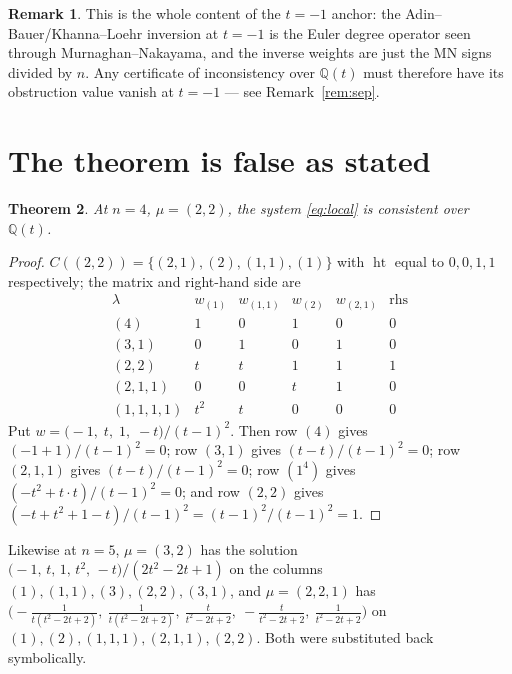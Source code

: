 \documentclass[11pt]{article}
\newtheorem{theorem}{Theorem}[section]
\theoremstyle{definition}
\newtheorem{remark}[theorem]{Remark}
\newcommand{\Q}{\mathbb{Q}}
\newcommand{\hgt}{\operatorname{ht}}      %
\begin{document}
\begin{remark}
This is the whole content of the $t=-1$ anchor: the Adin--Bauer/Khanna--Loehr inversion at
$t=-1$ is the Euler degree operator seen through Murnaghan--Nakayama, and the inverse weights
are just the MN signs divided by $n$. Any certificate of inconsistency over $\Q(t)$ must
therefore have its obstruction value vanish at $t=-1$ --- see Remark~\ref{rem:sep}.
\end{remark}

\section{The theorem is false as stated}\label{sec:false}

\begin{theorem}\label{thm:counterex}
At $n=4$, $\mu=(2,2)$, the system \eqref{eq:local} is consistent over $\Q(t)$.
\end{theorem}

\begin{proof}
$C((2,2))=\{(2,1),(2),(1,1),(1)\}$ with $\hgt$ equal to $0,0,1,1$ respectively; the matrix
and right-hand side are
\[
\begin{array}{l|cccc|c}
 \lambda & w_{(1)} & w_{(1,1)} & w_{(2)} & w_{(2,1)} & \text{rhs}\\\hline
 (4)       & 1 & 0 & 1 & 0 & 0\\
 (3,1)     & 0 & 1 & 0 & 1 & 0\\
 (2,2)     & t & t & 1 & 1 & 1\\
 (2,1,1)   & 0 & 0 & t & 1 & 0\\
 (1,1,1,1) & t^2& t& 0 & 0 & 0
\end{array}
\]
Put $w=\bigl(-1,\;t,\;1,\;-t\bigr)/(t-1)^2$. Then row $(4)$ gives $(-1+1)/(t-1)^2=0$; row
$(3,1)$ gives $(t-t)/(t-1)^2=0$; row $(2,1,1)$ gives $(t-t)/(t-1)^2=0$; row $(1^4)$ gives
$(-t^2+t\cdot t)/(t-1)^2=0$; and row $(2,2)$ gives
$(-t+t^2+1-t)/(t-1)^2=(t-1)^2/(t-1)^2=1$. \qedhere
\end{proof}

Likewise at $n=5$, $\mu=(3,2)$ has the solution
$\bigl(-1,\,t,\,1,\,t^2,\,-t\bigr)/(2t^2-2t+1)$ on the columns
$(1),(1,1),(3),(2,2),(3,1)$, and $\mu=(2,2,1)$ has
$\bigl(-\tfrac{1}{t(t^2-2t+2)},\ \tfrac{1}{t(t^2-2t+2)},\ \tfrac{t}{t^2-2t+2},\
-\tfrac{t}{t^2-2t+2},\ \tfrac{1}{t^2-2t+2}\bigr)$ on
$(1),(2),(1,1,1),(2,1,1),(2,2)$. Both were substituted back symbolically.
\end{document}
